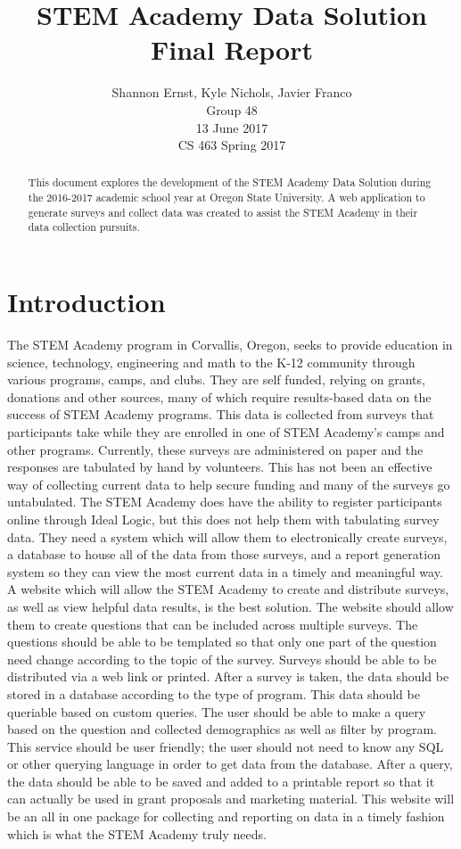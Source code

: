 \documentclass[letterpaper,10pt,serif,draftclsnofoot,onecolumn,compsoc,titlepage]{IEEEtran}
\title{STEM Academy Data Solution Final Report}
\author{Shannon Ernst, Kyle Nichols, Javier Franco\\ Group 48 \\ 13 June 2017 \\ CS 463 Spring 2017}
\begin{document}
\maketitle
\begin{abstract}
This document explores the development of the STEM Academy 
Data Solution during the 2016-2017 academic school year 
at Oregon State University. A web application to generate 
surveys and collect data was created to assist the 
STEM Academy in their data collection pursuits. 
\end{abstract}
\newpage
\tableofcontents
\newpage

\section{Introduction}
The STEM Academy program in Corvallis, Oregon, seeks to provide education in science, technology, engineering and math to the K-12 community through various programs, camps, and clubs.
They are self funded, relying on grants, donations and other sources, many of which require results-based data on the success of STEM Academy programs.
This data is collected from surveys that participants take while they are enrolled in one of STEM Academy's camps and other programs.
Currently, these surveys are administered on paper and the responses are tabulated by hand by volunteers.
This has not been an effective way of collecting current data to help secure funding and many of the surveys go untabulated.
The STEM Academy does have the ability to register participants online through Ideal Logic, but this does not help them with tabulating survey data.
They need a system which will allow them to electronically create surveys, a database to house all of the data from those surveys, and a report generation system so they can view the most current data in a timely and meaningful way.\\

A website which will allow the STEM Academy to create and distribute surveys, as well as view helpful data results, is the best solution.
The website should allow them to create questions that can be included across multiple surveys.
The questions should be able to be templated so that only one part of the question need change according to the topic of the survey.
Surveys should be able to be distributed via a web link or printed.
After a survey is taken, the data should be stored in a database according to the type of program.
This data should be queriable based on custom queries.
The user should be able to make a query based on the question and collected demographics as well as filter by program.
This service should be user friendly; the user should not need to know any SQL or other querying language in order to get data from the database.
After a query, the data should be able to be saved and added to a printable report so that it can actually be used in grant proposals and marketing material.
This website will be an all in one package for collecting and reporting on data in a timely fashion which is what the STEM Academy truly needs.\\
\end{document}
